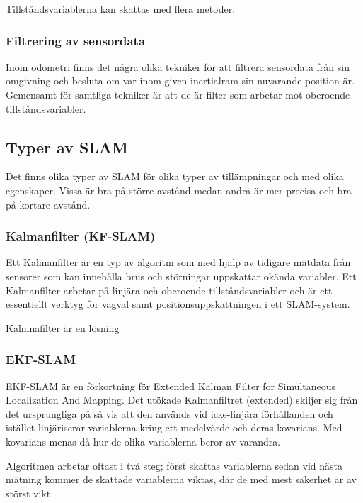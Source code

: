 \documentclass[a4paper,12pt,fleqn]{article}
\begin{document}
Tillståndsvariablerna kan skattas med flera metoder. 



\subsubsection{Filtrering av sensordata}

Inom odometri finns det några olika tekniker för att filtrera sensordata från sin omgivning och besluta om var inom given inertialram sin nuvarande position är. Gemensamt för samtliga tekniker är att de är filter som arbetar mot oberoende tillståndsvariabler. 





\subsection{Typer av SLAM}
Det finns olika typer av SLAM för olika typer av tillämpningar och med olika egenskaper. Vissa är bra på större avstånd medan andra är mer precisa och bra på kortare avstånd. 

\subsubsection{Kalmanfilter (KF-SLAM)}
Ett Kalmanfilter är en typ av algoritm som med hjälp av tidigare mätdata från sensorer som kan innehålla brus och störningar uppskattar okända variabler. Ett Kalmanfilter arbetar på linjära och oberoende tillståndsvariabler och är ett essentiellt verktyg för vägval samt positionsuppskattningen i ett SLAM-system. 

Kalmnafilter är en lösning

\subsubsection{EKF-SLAM} 
EKF-SLAM är en förkortning för Extended Kalman Filter for Simultaneous Localization And Mapping. Det utökade Kalmanfiltret (extended) skiljer sig från det ursprungliga på så vis att den används vid icke-linjära förhållanden och istället linjäriserar variablerna kring ett medelvärde och deras kovarians. Med kovarians menas då hur de olika variablerna beror av varandra.

Algoritmen arbetar oftast i två steg; först skattas variablerna sedan vid nästa mätning 
kommer de skattade variablerna viktas, där de med mest säkerhet är av störst vikt.
\end{document}
